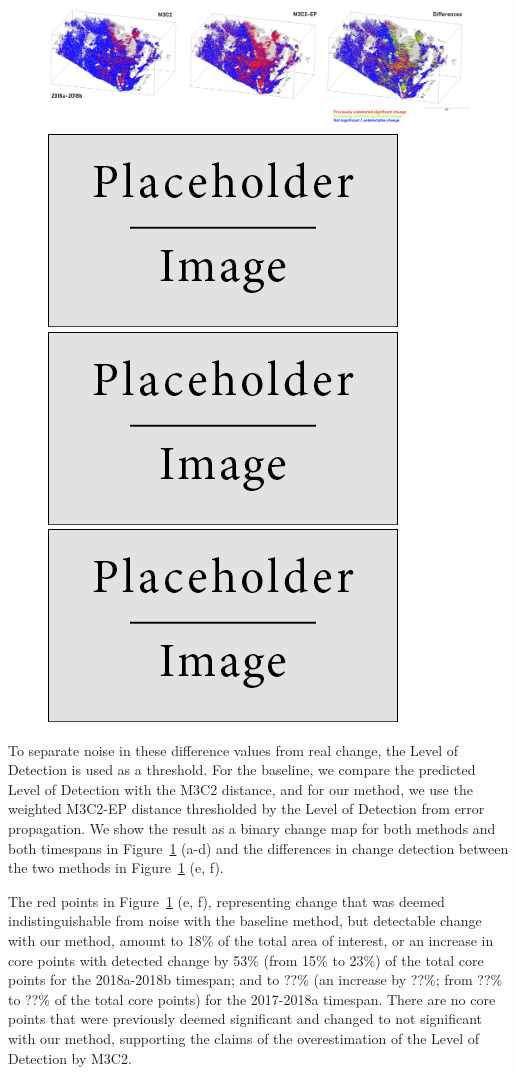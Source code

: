 \documentclass[preprint,12pt,3p]{elsarticle}
\begin{document}
\begin{figure}
    \centering
    \includegraphics[width=0.9\linewidth]{figs/result_sig_change_2018ab.png}
    \includegraphics[width=0.3\linewidth]{placeholder.jpg}\includegraphics[width=0.3\linewidth]{placeholder.jpg}\includegraphics[width=0.3\linewidth]{placeholder.jpg}
    \caption{}
    \label{fig:plot_d}
\end{figure}
 
To separate noise in these difference values from real change, the Level of Detection is used as a threshold. For the baseline, we compare the predicted Level of Detection with the M3C2 distance, and for our method, we use the weighted M3C2-EP distance thresholded by the Level of Detection from error propagation. We show the result as a binary change map for both methods and both timespans in Figure~\ref{fig:plot_d} (a-d) and the differences in change detection between the two methods in Figure~\ref{fig:plot_d} (e, f).
 
 The red points in Figure~\ref{fig:plot_d} (e, f), representing change that was deemed indistinguishable from noise with the baseline method, but detectable change with our method, amount to 18\% of the total area of interest, or an increase in core points with detected change by 53\% (from 15\% to 23\%) of the total core points for the 2018a-2018b timespan; and to ??\% (an increase by ??\%; from ??\% to ??\% of the total core points) for the 2017-2018a timespan. There are no core points that were previously deemed significant and changed to not significant with our method, supporting the claims of the overestimation of the Level of Detection by M3C2.
 
\end{document}
